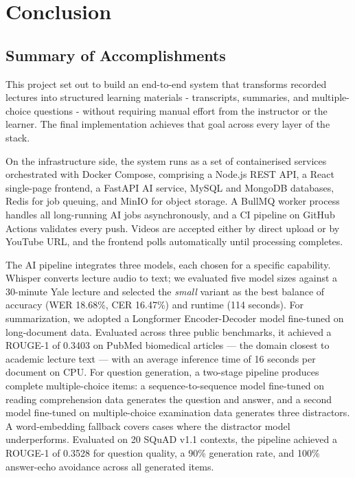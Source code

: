 \chapter{Conclusion}

\section{Summary of Accomplishments}

This project set out to build an end-to-end system that transforms recorded lectures into structured learning materials - transcripts, summaries, and multiple-choice questions - without requiring manual effort from the instructor or the learner. The final implementation achieves that goal across every layer of the stack.

On the infrastructure side, the system runs as a set of containerised services orchestrated with Docker Compose, comprising a Node.js REST API, a React single-page frontend, a FastAPI AI service, MySQL and MongoDB databases, Redis for job queuing, and MinIO for object storage. A BullMQ worker process handles all long-running AI jobs asynchronously, and a CI pipeline on GitHub Actions validates every push. Videos are accepted either by direct upload or by YouTube URL, and the frontend polls automatically until processing completes.

The AI pipeline integrates three models, each chosen for a specific capability. Whisper converts lecture audio to text; we evaluated five model sizes against a 30-minute Yale lecture and selected the \textit{small} variant as the best balance of accuracy (WER 18.68\%, CER 16.47\%) and runtime (114 seconds). For summarization, we adopted a Longformer Encoder-Decoder model fine-tuned on long-document data. Evaluated across three public benchmarks, it achieved a ROUGE-1 of 0.3403 on PubMed biomedical articles — the domain closest to academic lecture text — with an average inference time of 16 seconds per document on CPU. For question generation, a two-stage pipeline produces complete multiple-choice items: a sequence-to-sequence model fine-tuned on reading comprehension data generates the question and answer, and a second model fine-tuned on multiple-choice examination data generates three distractors. A word-embedding fallback covers cases where the distractor model underperforms. Evaluated on 20 SQuAD v1.1 contexts, the pipeline achieved a ROUGE-1 of 0.3528 for question quality, a 90\% generation rate, and 100\% answer-echo avoidance across all generated items.

